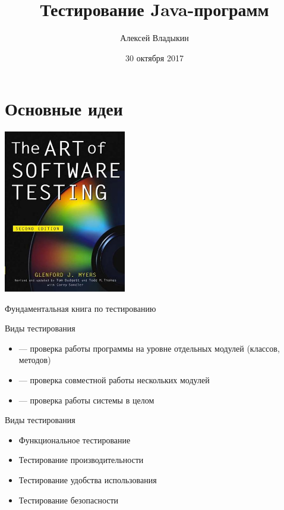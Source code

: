 \documentclass[unicode]{beamer}
\title{Тестирование Java-программ}
\author{Алексей Владыкин}
\date{30 октября 2017}
\begin{document}
\begin{frame}
\titlepage
\end{frame}

\begin{frame}
\tableofcontents
\end{frame}


\section{Основные идеи}

\begin{frame}
\centering
\includegraphics[width=0.4\textwidth]{pics/book.jpg}

Фундаментальная книга по тестированию
\end{frame}


\begin{frame}{Виды тестирования}
\begin{itemize}
\item {} --- проверка работы
    программы на уровне отдельных модулей (классов, методов)
    \bigskip

\item {} --- проверка
    совместной работы нескольких модулей
    \bigskip

\item {} --- проверка работы
    системы в целом
\end{itemize}
\end{frame}


\begin{frame}{Виды тестирования}
\begin{itemize}
\item Функциональное тестирование
    \bigskip

\item Тестирование производительности
    \bigskip

\item Тестирование удобства использования
    \bigskip

\item Тестирование безопасности
\end{itemize}
\end{frame}
\end{document}

